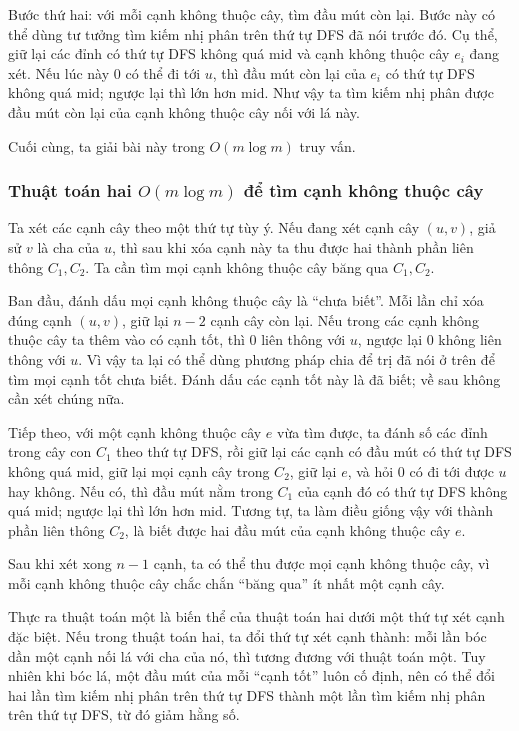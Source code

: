 \documentclass[11pt]{article}
\begin{document}
Bước thứ hai: với mỗi cạnh không thuộc cây, tìm đầu mút còn lại. Bước này có
thể dùng tư tưởng tìm kiếm nhị phân trên thứ tự DFS đã nói trước đó. Cụ thể, giữ
lại các đỉnh có thứ tự DFS không quá \(\mathrm{mid}\) và cạnh không thuộc cây
\(e_i\) đang xét. Nếu lúc này \(0\) có thể đi tới \(u\), thì đầu mút còn lại
của \(e_i\) có thứ tự DFS không quá \(\mathrm{mid}\); ngược lại thì lớn hơn
\(\mathrm{mid}\). Như vậy ta tìm kiếm nhị phân được đầu mút còn lại của cạnh
không thuộc cây nối với lá này.

Cuối cùng, ta giải bài này trong \(O(m\log m)\) truy vấn.

\subsubsection{Thuật toán hai \texorpdfstring{\(O(m\log m)\)}{O(m log m)}
để tìm cạnh không thuộc cây}

Ta xét các cạnh cây theo một thứ tự tùy ý. Nếu đang xét cạnh cây \((u,v)\), giả
sử \(v\) là cha của \(u\), thì sau khi xóa cạnh này ta thu được hai thành phần
liên thông \(C_1,C_2\). Ta cần tìm mọi cạnh không thuộc cây băng qua \(C_1,C_2\).

Ban đầu, đánh dấu mọi cạnh không thuộc cây là ``chưa biết''. Mỗi lần chỉ xóa
đúng cạnh \((u,v)\), giữ lại \(n-2\) cạnh cây còn lại. Nếu trong các cạnh không
thuộc cây ta thêm vào có cạnh tốt, thì \(0\) liên thông với \(u\), ngược lại
\(0\) không liên thông với \(u\). Vì vậy ta lại có thể dùng phương pháp chia để
trị đã nói ở trên để tìm mọi cạnh tốt chưa biết. Đánh dấu các cạnh tốt này là
đã biết; về sau không cần xét chúng nữa.

Tiếp theo, với một cạnh không thuộc cây \(e\) vừa tìm được, ta đánh số các đỉnh
trong cây con \(C_1\) theo thứ tự DFS, rồi giữ lại các cạnh có đầu mút có thứ
tự DFS không quá \(\mathrm{mid}\), giữ lại mọi cạnh cây trong \(C_2\), giữ lại
\(e\), và hỏi \(0\) có đi tới được \(u\) hay không. Nếu có, thì đầu mút nằm
trong \(C_1\) của cạnh đó có thứ tự DFS không quá \(\mathrm{mid}\); ngược lại
thì lớn hơn \(\mathrm{mid}\). Tương tự, ta làm điều giống vậy với thành phần
liên thông \(C_2\), là biết được hai đầu mút của cạnh không thuộc cây \(e\).

Sau khi xét xong \(n-1\) cạnh, ta có thể thu được mọi cạnh không thuộc cây, vì
mỗi cạnh không thuộc cây chắc chắn ``băng qua'' ít nhất một cạnh cây.

Thực ra thuật toán một là biến thể của thuật toán hai dưới một thứ tự xét cạnh
đặc biệt. Nếu trong thuật toán hai, ta đổi thứ tự xét cạnh thành: mỗi lần bóc
dần một cạnh nối lá với cha của nó, thì tương đương với thuật toán một. Tuy
nhiên khi bóc lá, một đầu mút của mỗi ``cạnh tốt'' luôn cố định, nên có thể đổi
hai lần tìm kiếm nhị phân trên thứ tự DFS thành một lần tìm kiếm nhị phân trên
thứ tự DFS, từ đó giảm hằng số.
\end{document}

